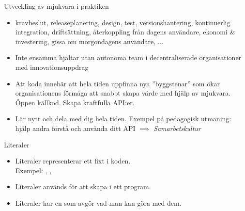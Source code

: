 \begin{Slide}{Utveckling av mjukvara i praktiken}
\begin{itemize}
\item {} kravbeslut, releaseplanering, design, test, versionshantering, kontinuerlig integration, driftsättning, återkoppling från dagens användare, ekonomi \& investering, gissa om morgondagens användare, ... 
\item {} Inte ensamma hjältar utan autonoma team i decentraliserade organisationer med innovationsuppdrag
\item {} Att koda innebär att hela tiden uppfinna nya ''byggstenar'' som ökar organisationens förmåga att snabbt skapa värde med hjälp av mjukvara. Öppen källkod. Skapa kraftfulla API:er.
\item {} Lär nytt och dela med dig hela tiden. Exempel på pedagogisk utmaning: hjälp andra förstå och använda ditt API $\implies$ \textit{Samarbetskultur}
\end{itemize}
\end{Slide}



\fi %

\begin{Slide}{Literaler}
\begin{itemize}
\item Literaler representerar ett fixt  i koden. \\
      Exempel: , ,  
\item Literaler används för att skapa  i ett program.
\item Literaler har en  som avgör vad man kan göra med dem.
\end{itemize}
\end{Slide}

